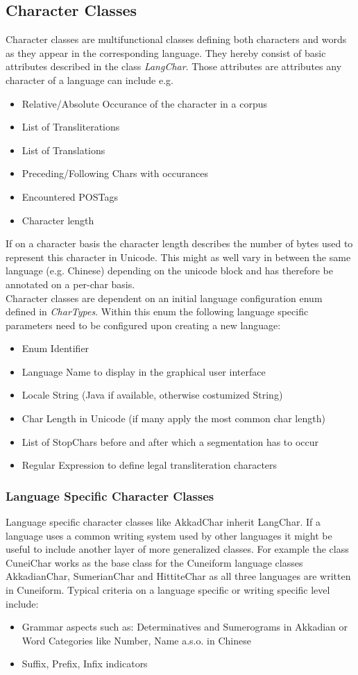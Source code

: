 \documentclass[10pt,a4paper,titlepage]{report}
\begin{document}
	\subsection{Character Classes}
	Character classes are multifunctional classes defining both characters and words as they appear in the corresponding language. They hereby consist of basic attributes described in the class \textit{LangChar}. Those attributes are attributes any character of a language can include e.g. \begin{itemize}
		\item Relative/Absolute Occurance of the character in a corpus
		\item List of Transliterations
		\item List of Translations
		\item Preceding/Following Chars with occurances
		\item Encountered POSTags
		\item Character length
	\end{itemize}
	If on a character basis the character length describes the number of bytes used to represent this character in Unicode. This might as well vary in between the same language (e.g. Chinese) depending on the unicode block and has therefore be annotated on a per-char basis.\\
	Character classes are dependent on an initial language configuration enum defined in \textit{CharTypes}. Within this enum the following language specific parameters need to be configured upon creating a new language:
	\begin{itemize}
		\item Enum Identifier
		\item Language Name to display in the graphical user interface
		\item Locale String (Java if available, otherwise costumized String)
		\item Char Length in Unicode (if many apply the most common char length)
		\item List of StopChars before and after which a segmentation has to occur
		\item Regular Expression to define legal transliteration characters
	\end{itemize}
	\subsubsection{Language Specific Character Classes}
	Language specific character classes like AkkadChar inherit LangChar. If a language uses a common writing system used by other languages it might be useful to include another layer of more generalized classes. For example the class CuneiChar works as the base class for the Cuneiform language classes AkkadianChar, SumerianChar and HittiteChar as all three languages are written in Cuneiform.
	Typical criteria on a language specific or writing specific level include:
	\begin{itemize}
		\item Grammar aspects such as: Determinatives and Sumerograms in Akkadian or Word Categories like Number, Name a.s.o. in Chinese
		\item Suffix, Prefix, Infix indicators
	\end{itemize}
\end{document}
